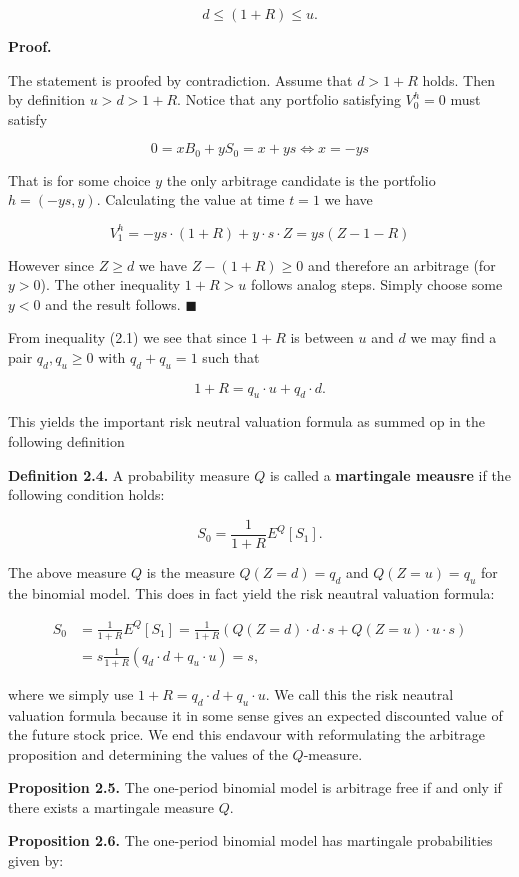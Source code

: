 \documentclass[
]{article}
\begin{document}
\[d\le (1+R)\le u.\tag{2.1}\]

\textbf{Proof.}

The statement is proofed by contradiction. Assume that \(d>1+R\) holds.
Then by definition \(u>d>1+R\). Notice that any portfolio satisfying
\(V_0^h=0\) must satisfy

\[0=xB_0+yS_0=x+ys\iff x=-ys\]

That is for some choice \(y\) the only arbitrage candidate is the
portfolio \(h=(-ys,y)\). Calculating the value at time \(t=1\) we have

\[V_1^h=-ys\cdot(1+R)+y\cdot s\cdot Z=ys(Z-1-R)\]

However since \(Z\ge d\) we have \(Z-(1+R)\ge 0\) and therefore an
arbitrage (for \(y>0\)). The other inequality \(1+R>u\) follows analog
steps. Simply choose some \(y<0\) and the result follows.
\(\blacksquare\)

From inequality (2.1) we see that since \(1+R\) is between \(u\) and
\(d\) we may find a pair \(q_d,q_u\ge 0\) with \(q_d+q_u=1\) such that

\[1+R=q_u\cdot u+q_d\cdot d.\]

This yields the important risk neutral valuation formula as summed op in
the following definition

\textbf{Definition 2.4.} A probability measure \(Q\) is called a
\textbf{martingale meausre} if the following condition holds:

\[S_0=\frac{1}{1+R}E^Q[S_1].\]

The above measure \(Q\) is the measure \(Q(Z=d)=q_d\) and \(Q(Z=u)=q_u\)
for the binomial model. This does in fact yield the risk neautral
valuation formula:

\begin{align*}
S_0&=\frac{1}{1+R}E^Q[S_1]=\frac{1}{1+R}(Q(Z=d)\cdot d\cdot s+Q(Z=u)\cdot u\cdot s)\\
&=s\frac{1}{1+R}(q_d\cdot d+q_u\cdot u)=s,
\end{align*}

where we simply use \(1+R=q_d\cdot d+q_u\cdot u\). We call this the risk
neautral valuation formula because it in some sense gives an expected
discounted value of the future stock price. We end this endavour with
reformulating the arbitrage proposition and determining the values of
the \(Q\)-measure.

\textbf{Proposition 2.5.} The one-period binomial model is arbitrage
free if and only if there exists a martingale measure \(Q\).

\textbf{Proposition 2.6.} The one-period binomial model has martingale
probabilities given by:
\end{document}
